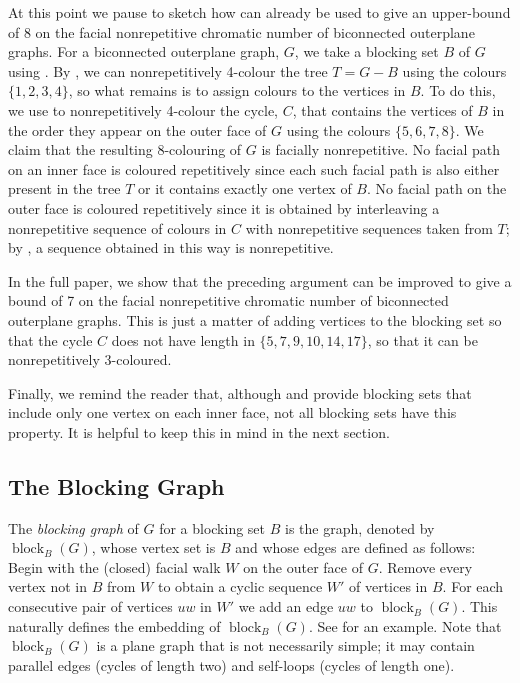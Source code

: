 \documentclass{cccg16}
\DeclareMathOperator{\block}{block}
\begin{document}
At this point we pause to sketch how 
can already be used to give an upper-bound of 8 on the facial
nonrepetitive chromatic number of biconnected outerplane graphs.  For a
biconnected outerplane graph, $G$, we take a blocking set $B$ of $G$
using .  By , we can nonrepetitively
4-colour the tree $T=G-B$ using the colours $\{1,2,3,4\}$, so
what remains is to assign colours to the vertices in $B$.  To do this,
we use  to nonrepetitively 4-colour the cycle, $C$, that
contains the vertices of $B$ in the order they appear on the outer face
of $G$ using the colours $\{5,6,7,8\}$.  We claim that the resulting
8-colouring of $G$ is facially nonrepetitive.  No facial path on an
inner face is coloured repetitively since each such facial path is also
either present in the tree $T$ or it contains exactly one vertex of $B$.
No facial path on the outer face is coloured repetitively since it is
obtained by interleaving a nonrepetitive sequence of colours in $C$
with nonrepetitive sequences taken from $T$; by ,
a sequence obtained in this way is nonrepetitive.

In the full paper, we show that the preceding argument can be
improved to give a bound of 7 on the facial nonrepetitive chromatic
number of biconnected outerplane graphs. This is just a matter of adding
vertices to the blocking set so that the cycle $C$ does not have length
in $\{5,7,9,10,14,17\}$, so that it can be nonrepetitively 3-coloured.

Finally, we remind the reader that, although  and
 provide blocking sets that include only one
vertex on each inner face, not all blocking sets have this property.
It is helpful to keep this in mind in the next section.

\subsection{The Blocking Graph}


The \emph{blocking graph} of $G$ for a blocking set $B$ is the graph,
denoted by $\block_B(G)$, whose vertex set is $B$ and whose edges are
defined as follows: Begin with the (closed) facial walk $W$ on the outer
face of $G$. Remove every vertex not in $B$ from $W$ to obtain a cyclic
sequence $W'$ of vertices in $B$. For each consecutive pair of vertices
$uw$ in $W'$ we add an edge $uw$ to $\block_B(G)$.  This naturally
defines the embedding of $\block_B(G)$. See 
for an example.   Note that $\block_B(G)$ is a plane graph that is not
necessarily simple; it may contain parallel edges (cycles of length
two) and self-loops (cycles of length one).
\end{document}
